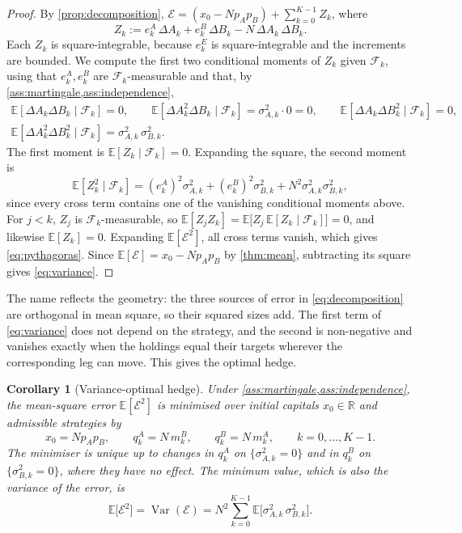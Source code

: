 \documentclass[11pt,a4paper]{article}
\theoremstyle{plain}
\newtheorem{corollary}[theorem]{Corollary}
\theoremstyle{definition}
\theoremstyle{remark}
\newcommand{\E}{\mathbb{E}}
\newcommand{\1}{\mathbf{1}}
\newcommand{\F}{\mathcal{F}}
\newcommand{\R}{\mathbb{R}}
\newcommand{\Var}{\operatorname{Var}}
\begin{document}
\begin{proof}
By \cref{prop:decomposition}, $\mathcal{E} = (x_0 - Np_Ap_B) + \sum_{k=0}^{K-1}Z_k$, where
\[
Z_k := e^A_k\,\Delta A_k + e^B_k\,\Delta B_k - N\,\Delta A_k\,\Delta B_k.
\]
Each $Z_k$ is square-integrable, because $e^E_k$ is square-integrable and the increments are bounded. We compute the first two conditional moments of $Z_k$ given $\F_k$, using that $e^A_k,e^B_k$ are $\F_k$-measurable and that, by \cref{ass:martingale,ass:independence},
\begin{gather*}
\E[\Delta A_k\Delta B_k\mid\F_k] = 0,\qquad \E[\Delta A_k^2\Delta B_k\mid\F_k] = \sigma^2_{A,k}\cdot 0 = 0,\qquad \E[\Delta A_k\Delta B_k^2\mid\F_k] = 0,\\
\E[\Delta A_k^2\Delta B_k^2\mid\F_k] = \sigma^2_{A,k}\,\sigma^2_{B,k}.
\end{gather*}
The first moment is $\E[Z_k\mid\F_k] = 0$. Expanding the square, the second moment is
\[
\E[Z_k^2\mid\F_k] = (e^A_k)^2\sigma^2_{A,k} + (e^B_k)^2\sigma^2_{B,k} + N^2\sigma^2_{A,k}\sigma^2_{B,k},
\]
since every cross term contains one of the vanishing conditional moments above. For $j<k$, $Z_j$ is $\F_k$-measurable, so $\E[Z_jZ_k] = \E\bigl[Z_j\,\E[Z_k\mid\F_k]\bigr] = 0$, and likewise $\E[Z_k]=0$. Expanding $\E[\mathcal{E}^2]$, all cross terms vanish, which gives \eqref{eq:pythagoras}. Since $\E[\mathcal{E}] = x_0 - Np_Ap_B$ by \cref{thm:mean}, subtracting its square gives \eqref{eq:variance}.
\end{proof}

The name reflects the geometry: the three sources of error in \eqref{eq:decomposition} are orthogonal in mean square, so their squared sizes add. The first term of \eqref{eq:variance} does not depend on the strategy, and the second is non-negative and vanishes exactly when the holdings equal their targets wherever the corresponding leg can move. This gives the optimal hedge.

\begin{corollary}[Variance-optimal hedge]
\label{cor:optimal}
Under \cref{ass:martingale,ass:independence}, the mean-square error $\E[\mathcal{E}^2]$ is minimised over initial capitals $x_0\in\R$ and admissible strategies by
\[
x_0 = Np_Ap_B,\qquad q^A_k = N\,m^B_k,\qquad q^B_k = N\,m^A_k,\qquad k=0,\dots,K-1.
\]
The minimiser is unique up to changes in $q^A_k$ on $\{\sigma^2_{A,k}=0\}$ and in $q^B_k$ on $\{\sigma^2_{B,k}=0\}$, where they have no effect. The minimum value, which is also the variance of the error, is
\[
\E\bigl[\mathcal{E}^2\bigr] = \Var(\mathcal{E}) = N^2\sum_{k=0}^{K-1}\E\bigl[\sigma^2_{A,k}\,\sigma^2_{B,k}\bigr].
\]
\end{corollary}
\end{document}
